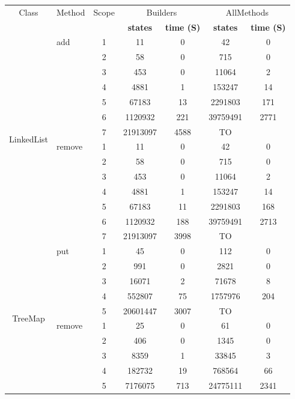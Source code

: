 \begin{table}
\scriptsize
\begin{tabular}{ c| l| c c c c c}
\hline
Class & Method & Scope &
\multicolumn{2}{c}{\textsf{Builders}} &
\multicolumn{2}{c}{\textsf{AllMethods}} \\
&&&
\tiny{\textbf{states}} & \tiny{\textbf{time (S)}} &
\tiny{\textbf{states}} & \tiny{\textbf{time (S)} }\\
\hline
\multirow{14}{*}{LinkedList} 
& add
  & 1 & 11  & 0 & 42  & 0 \\
& & 2 & 58  & 0 & 715 & 0 \\
& & 3 & 453 & 0 & 11064 & 2 \\
& & 4 & 4881  & 1 & 153247  & 14  \\
& & 5 & 67183 & 13  & 2291803 & 171 \\
& & 6 & 1120932 & 221 & 39759491  & 2771  \\
& & 7 & 21913097  & 4588  &TO  & \\

\cline{2-7}
 &remove 
  & 1 & 11  & 0 & 42  & 0 \\
& & 2 & 58  & 0 & 715 & 0 \\
& & 3 & 453 & 0 & 11064 & 2\\
& & 4 & 4881  & 1 & 153247  & 14\\
& & 5 & 67183 & 11  & 2291803 & 168\\
& & 6 & 1120932 & 188 & 39759491  & 2713\\
& & 7 & 21913097  & 3998  & TO \\ 

\hline
\multirow{10}{*}{TreeMap} 
& put
  & 1 & 45  & 0 & 112 & 0 \\
& & 2 & 991 & 0 & 2821  & 0 \\
& & 3 & 16071 & 2 & 71678 & 8 \\
& & 4 & 552807  & 75  & 1757976 & 204 \\
& & 5 & 20601447  & 3007  & TO& \\
\cline{2-7}

& remove
  & 1 & 25  & 0 & 61  & 0 \\
& & 2 & 406 & 0 & 1345  & 0 \\
& & 3 & 8359  & 1 & 33845 & 3 \\
& & 4 & 182732  & 19  & 768564  & 66  \\
& & 5 & 7176075 & 713 & 24775111  & 2341  \\






\end{tabular}
\end{table}
